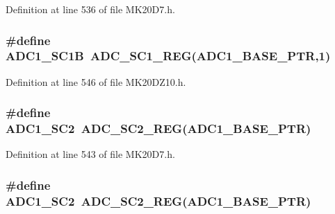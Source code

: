 Definition at line 536 of file M\+K20\+D7.\+h.

\subsubsection[{\texorpdfstring{A\+D\+C1\+\_\+\+S\+C1B}{ADC1_SC1B}}]{\setlength{\rightskip}{0pt plus 5cm}\#define A\+D\+C1\+\_\+\+S\+C1B~{\bf A\+D\+C\+\_\+\+S\+C1\+\_\+\+R\+EG}({\bf A\+D\+C1\+\_\+\+B\+A\+S\+E\+\_\+\+P\+TR},1)}\hypertarget{group___a_d_c___register___accessor___macros_ga1fd03625d4b519c97a65336bba6cb512}{}\label{group___a_d_c___register___accessor___macros_ga1fd03625d4b519c97a65336bba6cb512}


Definition at line 546 of file M\+K20\+D\+Z10.\+h.

\subsubsection[{\texorpdfstring{A\+D\+C1\+\_\+\+S\+C2}{ADC1_SC2}}]{\setlength{\rightskip}{0pt plus 5cm}\#define A\+D\+C1\+\_\+\+S\+C2~{\bf A\+D\+C\+\_\+\+S\+C2\+\_\+\+R\+EG}({\bf A\+D\+C1\+\_\+\+B\+A\+S\+E\+\_\+\+P\+TR})}\hypertarget{group___a_d_c___register___accessor___macros_gac7ef0831f8f7d17b7e39eed2535b2c5d}{}\label{group___a_d_c___register___accessor___macros_gac7ef0831f8f7d17b7e39eed2535b2c5d}


Definition at line 543 of file M\+K20\+D7.\+h.

\subsubsection[{\texorpdfstring{A\+D\+C1\+\_\+\+S\+C2}{ADC1_SC2}}]{\setlength{\rightskip}{0pt plus 5cm}\#define A\+D\+C1\+\_\+\+S\+C2~{\bf A\+D\+C\+\_\+\+S\+C2\+\_\+\+R\+EG}({\bf A\+D\+C1\+\_\+\+B\+A\+S\+E\+\_\+\+P\+TR})}\hypertarget{group___a_d_c___register___accessor___macros_gac7ef0831f8f7d17b7e39eed2535b2c5d}{}\label{group___a_d_c___register___accessor___macros_gac7ef0831f8f7d17b7e39eed2535b2c5d}


